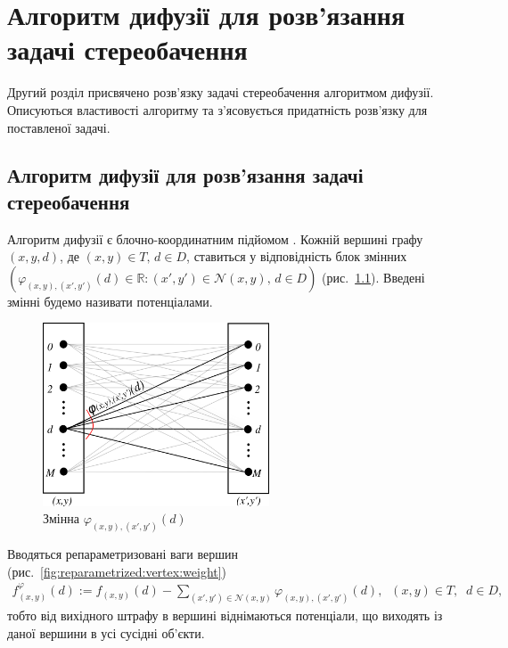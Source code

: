 \chapter{Алгоритм дифузії для розв'язання задачі стереобачення}

Другий розділ присвячено розв'язку задачі стереобачення алгоритмом дифузії.
Описуються властивості алгоритму та з'ясовується придатність
розв'язку для поставленої задачі.

\section{Алгоритм дифузії для розв'язання задачі стереобачення}

Алгоритм дифузії є блочно-координатним підйомом
\cite{overview:savchynskyy:diffusion}.
Кожній вершині графу $\left( x, y, d \right)$,
де $\left(x, y \right) \in T, \, d \in D$,
ставиться у відповідність блок змінних
$\left(
    \varphi_{\left(x, y \right), \left(x', y' \right)} \left(d \right) \in
    \mathbb{R} :
    \left(x', y' \right) \in \mathcal{N} \left(x, y \right), \,
    d \in D
\right)$ (рис.~\ref{fig:phi:block}).
Введені змінні будемо називати потенціалами.

\begin{figure}[h]
  \centering
  \includegraphics[width=0.6\textwidth]{images/phi_block}
  \caption{Змінна $\varphi_{\left(x, y \right), \left(x', y' \right)} \left(d \right)$}
  \label{fig:phi:block}
\end{figure}

Вводяться репараметризовані ваги вершин
(рис.~\ref{fig:reparametrized:vertex:weight})
\begin{equation} \label{reparametrized:vertex}
\begin{gathered}
    f_{\left(x, y \right)}^{\varphi} \left( d \right) :=
        f_{\left(x, y \right)} \left( d \right)
        - \sum \limits_{\left(x', y' \right) \in \mathcal{N} \left(x, y \right)}
            \varphi_{\left(x, y \right), \left(x', y' \right)} \left(
                d
                \right), \; \;
    \left(x, y \right) \in T, \; \;
    d \in D,
\end{gathered}
\end{equation}
тобто від вихідного штрафу в вершині віднімаються потенціали,
що виходять із даної вершини в усі сусідні об'єкти.

